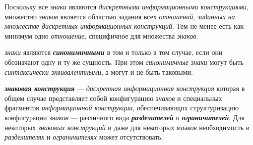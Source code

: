 Поскольку все \textit{знаки} являются \textit{дискретными информационными конструкциями}, множество \textit{знаков} является областью задания всех \textit{отношений, заданных на множестве дискретных \textit{информационных конструкций}}.
Тем не менее есть как минимум одно \textit{отношение}, специфичное для множества \textit{знаков}.

\begin{SCn}


\end{SCn}

\textit{знаки} являются \textbf{\textit{синонимичными}} в том и только в том случае, если они обозначают одну и ту же сущность.
При этом \textit{синонимичные знаки} могут быть \textit{синтаксически эквивалентными}, а могут и не быть таковыми.

\begin{SCn}


\end{SCn}

\textbf{\textit{знаковая конструкция}} --- \textit{дискретная информационная конструкция} которая в общем случае представляет собой конфигурацию \textit{знаков} и специальных фрагментов \textit{информационной конструкции}, обеспечивающих структуризацию конфигурации \textit{знаков} --- различного вида \textbf{\textit{разделителей}} и \textbf{\textit{ограничителей}}.
Для некоторых \textit{знаковых конструкций} и даже для некоторых \textit{языков} необходимость в \textit{разделителях} и \textit{ограничителях} может отсутствовать.

\begin{SCn}

        \begin{scnindent}
        \end{scnindent}

\end{SCn}

